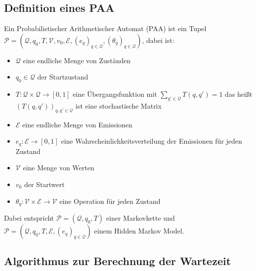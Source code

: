 
\subsection{Definition eines PAA}

\begin{definition}[PAA]
 Ein Probabilistischer Arithmetischer Automat (PAA) ist ein Tupel
 $ \mathcal{P} = (\mathcal{Q}, q_0, T, \mathcal{V}, v_0, \mathcal{E}, (e_q)_{q\in\mathcal{Q}}, (\theta_q)_{q\in\mathcal{Q}})$, dabei ist:
 \begin{itemize}
  \item $\mathcal{Q}$ eine endliche Menge von Zuständen
  \item $q_0 \in \mathcal{Q}$ der Startzustand
  \item $T: \mathcal{Q} \times \mathcal{Q} \rightarrow [0,1]$ eine Übergangsfunktion mit $\sum_{q' \in \mathcal{Q}} T(q, q') = 1 $ das heißt $(T(q,q'))_{q,q' \in \mathcal{Q}}$ ist eine stochastische Matrix
  \item $\mathcal{E}$ eine endliche Menge von Emissionen
  \item $e_q: \mathcal{E} \rightarrow [0,1]$ eine Wahrscheinlichkeitsverteilung der Emissionen für jeden Zustand
  \item $\mathcal{V}$ eine Menge von Werten
  \item $v_0$ der Startwert
  \item $\theta_q: \mathcal{V} \times \mathcal{E} \rightarrow \mathcal{V}$ eine Operation für jeden Zustand
 \end{itemize}
\end{definition}
Dabei entspricht $ \mathcal{P} = (\mathcal{Q}, q_0, T)$ einer Markovkette und $ \mathcal{P} = (\mathcal{Q}, q_0, T, \mathcal{E}, (e_q)_{q\in\mathcal{Q}})$ einem Hidden Markov Model. 

\subsection{Algorithmus zur Berechnung der Wartezeit}

